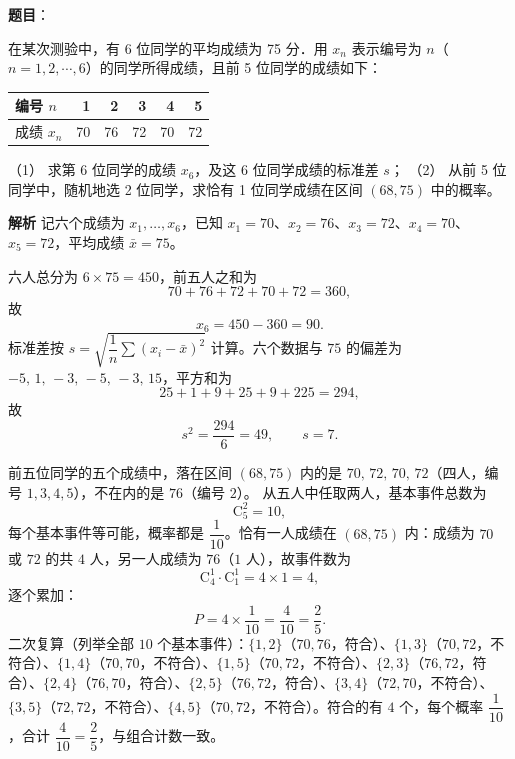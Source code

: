 \begin{answer}

\textbf{题目}：

在某次测验中，有 6 位同学的平均成绩为 75 分．用 $x_n$ 表示编号为 $n$（$n=1,2,\cdots,6$）的同学所得成绩，且前 5 位同学的成绩如下：

\begin{center}
\begin{tabular}{lrrrrr}
\toprule
编号 $n$ & 1 & 2 & 3 & 4 & 5 \\
\midrule
成绩 $x_n$ & 70 & 76 & 72 & 70 & 72 \\
\bottomrule
\end{tabular}
\end{center}

（1） 求第 6 位同学的成绩 $x_6$，及这 6 位同学成绩的标准差 $s$；
（2） 从前 5 位同学中，随机地选 2 位同学，求恰有 1 位同学成绩在区间 $(68,75)$ 中的概率。

\textbf{解析}
记六个成绩为 $x_1,\dots,x_6$，已知 $x_1=70$、$x_2=76$、$x_3=72$、$x_4=70$、$x_5=72$，平均成绩 $\bar x=75$。

六人总分为 $6\times75=450$，前五人之和为
\nopagebreak[4]
\[
70+76+72+70+72=360,
\]
故
\nopagebreak[4]
\[
x_6=450-360=90.
\]
标准差按 $s=\sqrt{\dfrac1n\sum(x_i-\bar x)^2}$ 计算。六个数据与 $75$ 的偏差为 $-5,\,1,\,-3,\,-5,\,-3,\,15$，平方和为
\nopagebreak[4]
\[
25+1+9+25+9+225=294,
\]
故
\nopagebreak[4]
\[
s^2=\frac{294}{6}=49,\qquad s=7.
\]

前五位同学的五个成绩中，落在区间 $(68,75)$ 内的是 $70,\,72,\,70,\,72$（四人，编号 $1,3,4,5$），不在内的是 $76$（编号 $2$）。
从五人中任取两人，基本事件总数为
\nopagebreak[4]
\[
\mathrm C_5^2=10,
\]
每个基本事件等可能，概率都是 $\dfrac1{10}$。恰有一人成绩在 $(68,75)$ 内：成绩为 $70$ 或 $72$ 的共 $4$ 人，另一人成绩为 $76$（$1$ 人），故事件数为
\nopagebreak[4]
\[
\mathrm C_4^1\cdot\mathrm C_1^1=4\times1=4,
\]
逐个累加：
\nopagebreak[4]
\[
P=4\times\frac1{10}=\frac{4}{10}=\frac25.
\]
二次复算（列举全部 $10$ 个基本事件）：$\{1,2\}$（$70,76$，符合）、$\{1,3\}$（$70,72$，不符合）、$\{1,4\}$（$70,70$，不符合）、$\{1,5\}$（$70,72$，不符合）、$\{2,3\}$（$76,72$，符合）、$\{2,4\}$（$76,70$，符合）、$\{2,5\}$（$76,72$，符合）、$\{3,4\}$（$72,70$，不符合）、$\{3,5\}$（$72,72$，不符合）、$\{4,5\}$（$70,72$，不符合）。符合的有 $4$ 个，每个概率 $\dfrac1{10}$，合计 $\dfrac4{10}=\dfrac25$，与组合计数一致。



\end{answer}
